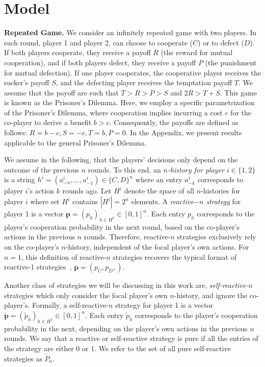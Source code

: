 \documentclass{article}
\theoremstyle{definition}
\begin{document}
\section{Model}

\textbf{Repeated Game.}
We consider an infinitely repeated game with two players. In each round, player 1
and player 2, can choose to cooperate ($C$) or to defect ($D$). If both players
cooperate, they receive a payoff $R$ (the reward for mutual cooperation), and if
both players defect, they receive a payoff $P$ (the punishment for mutual
defection). If one player cooperates, the cooperative player receives the
sucker's payoff $S$, and the defecting player receives the temptation payoff
$T$. We assume that the payoff are such that $T > R > P > S$ and $2 R > T + S$.
This game is known as the Prisoner's Dilemma. Here, we
employ a specific parametrization of the Prisoner's Dilemma, where cooperation
implies incurring a cost $c$ for the co-player to derive a benefit $b > c$.
Consequently, the payoffs are defined as follows: \(R = b - c, S = -c, T = b, P =
0\). In the Appendix, we present results applicable to the general Prisoner's
Dilemma.

We assume in the following, that the players' decisions only depend on the
outcome of the previous $n$ rounds. To this end, an {\it $n$-history for player
$i \in \{1, 2\}$} is a string $h^i=(a^i_{-n},\ldots,a^i_{-1})\!\in\!\{C,D\}^n$
where an entry $a^i_{-k}$ corresponds to player $i$'s action $k$ rounds ago. Let
$H^i$ denote the space of all $n$-histories for player $i$ where set $H^i$ contains
$|H^i|=2^{n}$ elements. A {\it reactive$-n$ strategy} for player 1 is a vector
$\mathbf{p}=(p_h)_{h\in H^2} \in [0, 1]^{n}$. Each entry $p_h$ corresponds to
the player's cooperation probability in the next round, based on the co-player's
actions in the previous $n$ rounds. Therefore, reactive-$n$ strategies
exclusively rely on the co-player's $n$-history, independent of the focal
player's own actions. For \(n=1\), this definition of reactive-\(n\) strategies
recovers the typical format of reactive-1 strategies~\citep{baek:scientific:2016, wahl:JTB:1999, mcavoy:PRSA:2019},
\(\mathbf{p}=(p_C, p_D,)\).

Another class of strategies we will be discussing in this work are, {\it
self-reactive-$n$} strategies which only consider the focal player's own
$n$-history, and ignore the co-player's. Formally, a self-reactive-$n$ strategy
for player 1 is a vector $\mathbf{\tilde{p}} = (\tilde{p}_h)_{h \in H^1} \in [0,
1] ^ {n}$. Each entry $\tilde{p}_h$ corresponds to the player's cooperation
probability in the next, depending on the player's own actions in the previous
$n$ rounds. We say that a reactive or self-reactive strategy is pure if all the
entries of the strategy are either 0 or 1. We refer to the set of all pure
self-reactive strategies as $\tilde{P}_n$.
\end{document}

